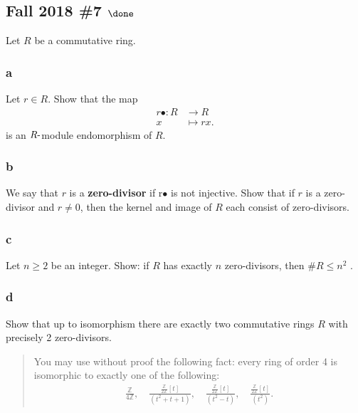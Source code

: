 \hypertarget{fall-2018-7-done}{%
\subsection{\texorpdfstring{Fall 2018 \#7
\(\done\)}{Fall 2018 \#7 \textbackslash done}}\label{fall-2018-7-done}}

Let \(R\) be a commutative ring.

\hypertarget{a-37}{%
\subsubsection{a}\label{a-37}}

Let \(r \in R\). Show that the map
\begin{align*}
r\bullet : R &\to R \\
x &\mapsto r x
.\end{align*}
is an \(R{\hbox{-}}\)module endomorphism of \(R\).

\hypertarget{b-27}{%
\subsubsection{b}\label{b-27}}

We say that \(r\) is a \textbf{zero-divisor} if r\(\bullet\) is not
injective. Show that if \(r\) is a zero-divisor and \(r \neq 0\), then
the kernel and image of \(R\) each consist of zero-divisors.

\hypertarget{c-20}{%
\subsubsection{c}\label{c-20}}

Let \(n \geq 2\) be an integer. Show: if \(R\) has exactly \(n\)
zero-divisors, then \(\#R \leq n^2\) .

\hypertarget{d-7}{%
\subsubsection{d}\label{d-7}}

Show that up to isomorphism there are exactly two commutative rings
\(R\) with precisely 2 zero-divisors.

\begin{quote}
You may use without proof the following fact: every ring of order 4 is
isomorphic to exactly one of the following:
\begin{align*}
\frac{ {\mathbb{Z}}}{ 4{\mathbb{Z}}}, \quad
\frac{ \frac{  {\mathbb{Z}}}{ 2{\mathbb{Z}}} [t]}{(t^2 + t + 1)}, \quad
\frac{ \frac{ {\mathbb{Z}}}{ 2{\mathbb{Z}}} [t]}{ (t^2 - t)}, \quad
\frac{ \frac{ {\mathbb{Z}}}{2{\mathbb{Z}}}[t]}{(t^2 )}
.\end{align*}
\end{quote}

